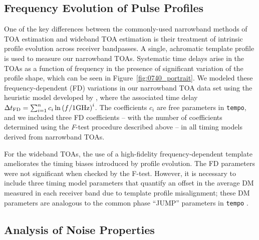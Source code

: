 \documentclass[twocolumn]{aastex63}
\newcommand{\tempo}{{\tt tempo}}
\begin{document}
\subsection{Frequency Evolution of Pulse Profiles}
\label{subsec:methods_profile}

One of the key differences between the commonly-used narrowband methods of TOA estimation and wideband TOA estimation is their treatment of intrinsic profile evolution across receiver bandpasses.  A single, achromatic template profile is used to measure our narrowband TOAs.  Systematic time delays arise in the TOAs as a function of frequency in the presence of significant variation of the profile shape, which can be seen in Figure~\ref{fig:0740_portrait}.  We modeled these frequency-dependent (FD) variations in our narrowband TOA data set using the heuristic model developed by \citet{abb+15}, where the associated time delay $\Delta t_{\rm FD} = \sum_{i=1}^n c_i\ln{(f / 1 \mathrm{GHz})}^i$. The coefficients $c_i$ are free parameters in \tempo{}, and we included three FD coefficients -- with the number of coefficients determined using the {\it F}-test procedure described above -- in all timing models derived from narrowband TOAs.

For the wideband TOAs, the use of a high-fidelity frequency-dependent template ameliorates the timing biases introduced by profile evolution.  The FD parameters were not significant when checked by the F-test.  However, it is necessary to include three timing model parameters that quantify an offset in the average DM measured in each receiver band due to template profile misalignment; these DM parameters are analogous to the common phase ``JUMP'' parameters in \tempo{} \citep[see the ``DMJUMP'' parameters described in][]{aab+21b}.

\subsection{Analysis of Noise Properties}
\label{subsec:methods_noise}
\end{document}
